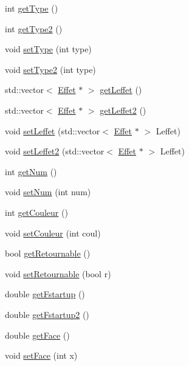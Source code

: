 \begin{DoxyCompactItemize}
\item 
int \hyperlink{class_carte_aa58ee91b50b7e5e1d2483acb698b59f4}{get\-Type} ()
\item 
int \hyperlink{class_carte_a78fd9aadbd17a4649669117ada726dfa}{get\-Type2} ()
\item 
void \hyperlink{class_carte_a16726786b2df18980f82b9f19d72cd00}{set\-Type} (int type)
\item 
void \hyperlink{class_carte_a78d440deb46f085e53d29cbb81c39c0f}{set\-Type2} (int type)
\item 
std\-::vector$<$ \hyperlink{class_effet}{Effet} $\ast$ $>$ \hyperlink{class_carte_a4410810499a30afcdfe51a70db079dfa}{get\-Leffet} ()
\item 
std\-::vector$<$ \hyperlink{class_effet}{Effet} $\ast$ $>$ \hyperlink{class_carte_ae66d95ae0ba845fe4b5601c36b68cabd}{get\-Leffet2} ()
\item 
void \hyperlink{class_carte_a92a0d5cda40ca72720524937f88f497b}{set\-Leffet} (std\-::vector$<$ \hyperlink{class_effet}{Effet} $\ast$ $>$ Leffet)
\item 
void \hyperlink{class_carte_a1fc20e7a2df33a2ca24ebea22c18f074}{set\-Leffet2} (std\-::vector$<$ \hyperlink{class_effet}{Effet} $\ast$ $>$ Leffet)
\item 
int \hyperlink{class_carte_ae4ede142122a382b2b6648906c4cd37a}{get\-Num} ()
\item 
void \hyperlink{class_carte_a6d5eb0a01948dc48a9c86b7c5083be29}{set\-Num} (int num)
\item 
int \hyperlink{class_carte_a87f5a4affacf484c8e1f308abf4ec514}{get\-Couleur} ()
\item 
void \hyperlink{class_carte_a8736424ac59160d97300befe55b12eea}{set\-Couleur} (int coul)
\item 
bool \hyperlink{class_carte_a4564309a6927eb31e2e0641d1fc80315}{get\-Retournable} ()
\item 
void \hyperlink{class_carte_a53c600ae84b2c9033cede1e147e7de60}{set\-Retournable} (bool r)
\item 
double \hyperlink{class_carte_aac84bc0e598a0c5180ff74e945963a3a}{get\-Fstartup} ()
\item 
double \hyperlink{class_carte_a759d6b7a8b08cf7a6d1e0e5f4e10c28c}{get\-Fstartup2} ()
\item 
double \hyperlink{class_carte_ac742ba23680cb680376984a3b89dcce1}{get\-Face} ()
\item 
void \hyperlink{class_carte_a72278c63fcebe0f1fb38e6f6a49244e9}{set\-Face} (int x)
\item 

\end{DoxyCompactItemize}
